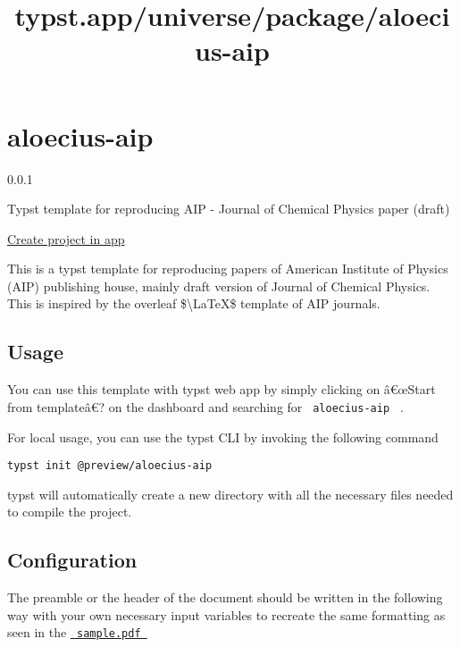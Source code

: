 \title{typst.app/universe/package/aloecius-aip}

\label{banner}
\label{template-thumbnail}

\section{aloecius-aip}\label{aloecius-aip}

{ 0.0.1 }

Typst template for reproducing AIP - Journal of Chemical Physics paper
(draft)

\href{/app?template=aloecius-aip&version=0.0.1}{Create project in app}

\label{readme}
This is a typst template for reproducing papers of American Institute of
Physics (AIP) publishing house, mainly draft version of Journal of
Chemical Physics. This is inspired by the overleaf
\$\textbackslash LaTeX\$ template of AIP journals.

\subsection{Usage}\label{usage}

You can use this template with typst web app by simply clicking on
â€œStart from templateâ€? on the dashboard and searching for
\texttt{\ aloecius-aip\ } .

For local usage, you can use the typst CLI by invoking the following
command

\begin{verbatim}
typst init @preview/aloecius-aip
\end{verbatim}

typst will automatically create a new directory with all the necessary
files needed to compile the project.

\subsection{Configuration}\label{configuration}

The preamble or the header of the document should be written in the
following way with your own necessary input variables to recreate the
same formatting as seen in the
\href{https://github.com/typst/packages/raw/main/packages/preview/aloecius-aip/0.0.1/sample.pdf}{\texttt{\ sample.pdf\ }}

